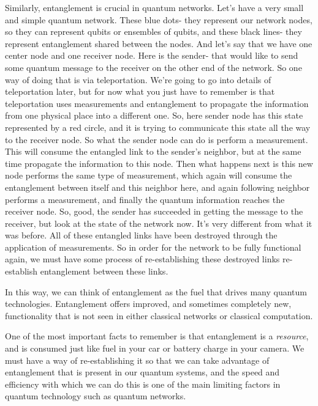 Similarly, entanglement is crucial in quantum networks. Let's have a very small and simple quantum network. These blue dots- they represent our network nodes, so they can represent qubits or ensembles of qubits, and these black lines- they represent entanglement shared between the nodes. And let's say that we have one center node and one receiver node. Here is the sender- that would like to send some quantum message to the receiver on the other end of the network. So one way of doing that is via teleportation. We're going to go into details of teleportation later, but for now what you just have to remember is that teleportation uses measurements and entanglement to propagate the information from one physical place into a different one. So, here sender node has this state represented by a red circle, and it is trying to communicate this state all the way to the receiver node. So what the sender node can do is perform a measurement. This will consume the entangled link to the sender's neighbor, but at the same time propagate the information to this node. Then what happens next is this new node performs the same type of measurement, which again will consume the entanglement between itself and this neighbor here, and again following neighbor performs a measurement, and finally the quantum information reaches the receiver node. So, good, the sender has succeeded in getting the message to the receiver, but look at the state of the network now. It's very different from what it was before. All of these entangled links have been destroyed through the application of measurements. So in order for the network to be fully functional again, we must have some process of re-establishing these destroyed links re-establish entanglement between these links.

In this way, we can think of entanglement as the fuel that drives many quantum technologies. Entanglement offers improved, and sometimes completely new, functionality that is not seen in either classical networks or classical computation.

One of the most important facts to remember is that entanglement is a \emph{resource}, and is consumed just like fuel in your car or battery charge in your camera. We must have a way of re-establishing it so that we can take advantage of entanglement that is present in our quantum systems, and the speed and efficiency with which we can do this is one of the main limiting factors in quantum technology such as quantum networks.


